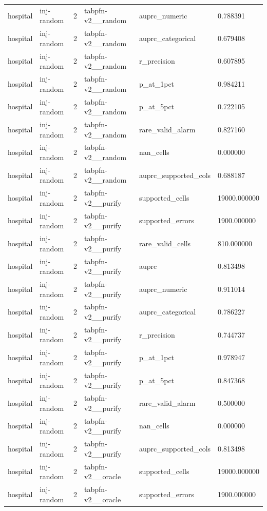 \begin{tabular}{llllll}
hospital & inj-random & 2 & tabpfn-v2\_\_random & auprc\_numeric & 0.788391 \\
hospital & inj-random & 2 & tabpfn-v2\_\_random & auprc\_categorical & 0.679408 \\
hospital & inj-random & 2 & tabpfn-v2\_\_random & r\_precision & 0.607895 \\
hospital & inj-random & 2 & tabpfn-v2\_\_random & p\_at\_1pct & 0.984211 \\
hospital & inj-random & 2 & tabpfn-v2\_\_random & p\_at\_5pct & 0.722105 \\
hospital & inj-random & 2 & tabpfn-v2\_\_random & rare\_valid\_alarm & 0.827160 \\
hospital & inj-random & 2 & tabpfn-v2\_\_random & nan\_cells & 0.000000 \\
hospital & inj-random & 2 & tabpfn-v2\_\_random & auprc\_supported\_cols & 0.688187 \\
hospital & inj-random & 2 & tabpfn-v2\_\_purify & supported\_cells & 19000.000000 \\
hospital & inj-random & 2 & tabpfn-v2\_\_purify & supported\_errors & 1900.000000 \\
hospital & inj-random & 2 & tabpfn-v2\_\_purify & rare\_valid\_cells & 810.000000 \\
hospital & inj-random & 2 & tabpfn-v2\_\_purify & auprc & 0.813498 \\
hospital & inj-random & 2 & tabpfn-v2\_\_purify & auprc\_numeric & 0.911014 \\
hospital & inj-random & 2 & tabpfn-v2\_\_purify & auprc\_categorical & 0.786227 \\
hospital & inj-random & 2 & tabpfn-v2\_\_purify & r\_precision & 0.744737 \\
hospital & inj-random & 2 & tabpfn-v2\_\_purify & p\_at\_1pct & 0.978947 \\
hospital & inj-random & 2 & tabpfn-v2\_\_purify & p\_at\_5pct & 0.847368 \\
hospital & inj-random & 2 & tabpfn-v2\_\_purify & rare\_valid\_alarm & 0.500000 \\
hospital & inj-random & 2 & tabpfn-v2\_\_purify & nan\_cells & 0.000000 \\
hospital & inj-random & 2 & tabpfn-v2\_\_purify & auprc\_supported\_cols & 0.813498 \\
hospital & inj-random & 2 & tabpfn-v2\_\_oracle & supported\_cells & 19000.000000 \\
hospital & inj-random & 2 & tabpfn-v2\_\_oracle & supported\_errors & 1900.000000 \\

\end{tabular}
